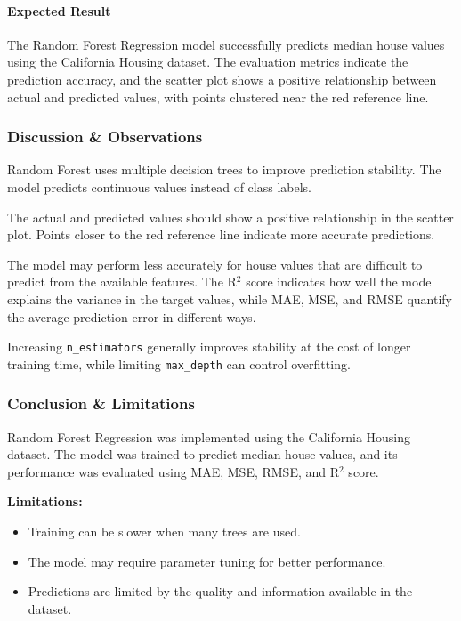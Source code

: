\documentclass[a4paper,11pt]{article}
\begin{document}
\paragraph{Expected Result}
The Random Forest Regression model successfully predicts median house values using the California Housing dataset. The evaluation metrics indicate the prediction accuracy, and the scatter plot shows a positive relationship between actual and predicted values, with points clustered near the red reference line.

\subsubsection{Discussion \& Observations}

Random Forest uses multiple decision trees to improve prediction stability. The model predicts continuous values instead of class labels.

The actual and predicted values should show a positive relationship in the scatter plot. Points closer to the red reference line indicate more accurate predictions.

The model may perform less accurately for house values that are difficult to predict from the available features. The R$^2$ score indicates how well the model explains the variance in the target values, while MAE, MSE, and RMSE quantify the average prediction error in different ways.

Increasing \texttt{n\_estimators} generally improves stability at the cost of longer training time, while limiting \texttt{max\_depth} can control overfitting.

\subsubsection{Conclusion \& Limitations}

Random Forest Regression was implemented using the California Housing dataset. The model was trained to predict median house values, and its performance was evaluated using MAE, MSE, RMSE, and R$^2$ score.

\textbf{Limitations:}
\begin{itemize}
    \item Training can be slower when many trees are used.
    \item The model may require parameter tuning for better performance.
    \item Predictions are limited by the quality and information available in the dataset.
\end{itemize}
\end{document}

